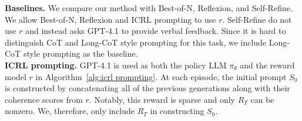 \documentclass{article} %
\newcommand{\sz}[1]{({\color{red} {Shangtong: #1}})}
\newcommand{\kf}[1]{({\color{teal} {gary: #1}})}
\newcommand{\0}{\mathbf{0}}
\begin{document}

\textbf{Baselines.} We compare our method with Best-of-N, Reflexion, and Self-Refine.  
We allow Best-of-N, Reflexion and ICRL prompting to use $r$. 
Self-Refine do not use $r$ and instead asks GPT-4.1 to provide verbal feedback.
Since it is hard to distinguish CoT and Long-CoT style prompting for this task, we include Long-CoT style prompting as the baseline. \\
\textbf{ICRL prompting.} GPT-4.1 is used as both the policy LLM $\pi_\theta$ and the reward model $r$ in Algorithm~\ref{alg:icrl prompting}. At each episode, the initial prompt  $S_0$ is constructed by concatenating all of the previous generations along with their coherence scores from $r$. 
Notably, this reward is sparse and only $R_T$ can be nonzero.
We, therefore, only include $R_T$ in constructing $S_0$.\hfil~
\end{document}
